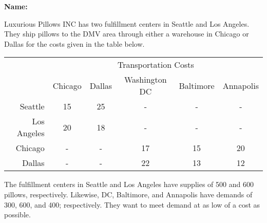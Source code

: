 \documentclass[letterpaper,oneside,12pt]{article}%
\begin{document}
\noindent{}

\vspace{3mm} \hspace{\fill} \textbf{Name: \underline{\hspace{6cm}}}

Luxurious Pillows INC has two fulfillment centers in Seattle and Los Angeles. They ship pillows to the DMV area through either a warehouse in Chicago or Dallas for the costs given in the table below.

\begin{center}
\begin{tabular}{r|ccccc}
& \multicolumn{5}{c}{Transportation Costs} \\
             & Chicago & Dallas & Washington DC & Baltimore & Annapolis \\
\hline
Seattle      & 15      & 25     &       -       &    -      & -  \\
Los Angeles  & 20      & 18     & -             & -         & -  \\
Chicago      & -       & -      & 17            & 15        & 20 \\ 
Dallas       & -       & -      & 22            & 13        & 12 \\
\hline
\end{tabular}
\end{center}

The fulfillment centers in Seattle and Los Angeles have supplies of 500 and 600 pillows, respectively. Likewise, DC, Baltimore, and Annapolis have demands of 300, 600, and 400; respectively. They want to meet demand at as low of a cost as possible.
\end{document}
